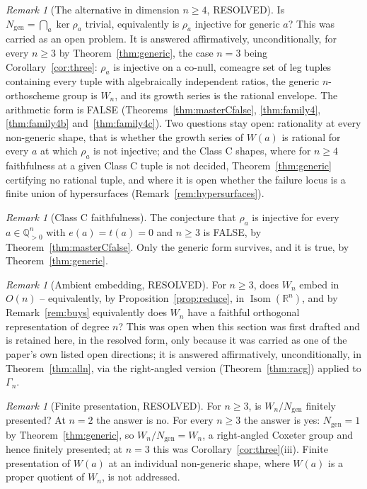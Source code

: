 \documentclass[11pt]{article}
\theoremstyle{definition}
\theoremstyle{remark}
\newtheorem{remark}[theorem]{Remark}
\theoremstyle{definition}
\newcommand{\Q}{\mathbb{Q}}
\newcommand{\R}{\mathbb{R}}
\newcommand{\Isom}{\operatorname{Isom}}
\begin{document}
\begin{remark}[The alternative in dimension $n\ge4$, RESOLVED]\label{prob:alternative}
Is $N_{\mathrm{gen}}=\bigcap_a\ker\rho_a$ trivial, equivalently is $\rho_a$ injective for
generic $a$? This was carried as an open problem. It is answered affirmatively, unconditionally,
for every $n\ge3$ by Theorem~\ref{thm:generic}, the case $n=3$ being Corollary~\ref{cor:three}:
$\rho_a$ is injective on a co-null, comeagre set of leg tuples containing every tuple with
algebraically independent ratios, the generic $n$-orthoscheme group is $W_n$, and its growth series
is the rational envelope. The arithmetic form is FALSE (Theorems~\ref{thm:masterCfalse},
\ref{thm:family4}, \ref{thm:family4b} and~\ref{thm:family4c}). Two questions stay open:
rationality at every non-generic shape, that is whether the growth series of $W(a)$ is rational
for every $a$ at which $\rho_a$ is not injective; and the Class C shapes, where for $n\ge4$
faithfulness at a given Class C tuple is not decided, Theorem~\ref{thm:generic} certifying no
rational tuple, and where it is open whether the failure locus is a finite union of hypersurfaces
(Remark~\ref{rem:hypersurfaces}).
\end{remark}

\begin{remark}[Class C faithfulness]\label{conj:masterC}
The conjecture that $\rho_a$ is injective for every $a\in\Q_{>0}^n$ with $e(a)=t(a)=0$ and
$n\ge3$ is FALSE, by Theorem~\ref{thm:masterCfalse}. Only the generic form survives, and it is
true, by Theorem~\ref{thm:generic}.
\end{remark}

\begin{remark}[Ambient embedding, RESOLVED]\label{prob:embed}
For $n\ge3$, does $W_n$ embed in $O(n)$ -- equivalently, by Proposition~\ref{prop:reduce}, in
$\Isom(\R^n)$, and by Remark~\ref{rem:buys} equivalently does $W_n$ have a faithful orthogonal
representation of degree $n$? This was open when this section was first drafted and is retained
here, in the resolved form, only because it was carried as one of the paper's own listed open
directions; it is answered affirmatively, unconditionally, in Theorem~\ref{thm:alln}, via the
right-angled version (Theorem~\ref{thm:racg}) applied to $\Gamma_n$.
\end{remark}

\begin{remark}[Finite presentation, RESOLVED]\label{prob:fp}
For $n\ge3$, is $W_n/N_{\mathrm{gen}}$ finitely presented? At $n=2$ the answer is no. For every
$n\ge3$ the answer is yes: $N_{\mathrm{gen}}=1$ by Theorem~\ref{thm:generic}, so
$W_n/N_{\mathrm{gen}}=W_n$, a right-angled Coxeter group and hence finitely presented; at $n=3$
this was Corollary~\ref{cor:three}(iii). Finite presentation of $W(a)$ at an individual
non-generic shape, where $W(a)$ is a proper quotient of $W_n$, is not addressed.
\end{remark}
\end{document}
